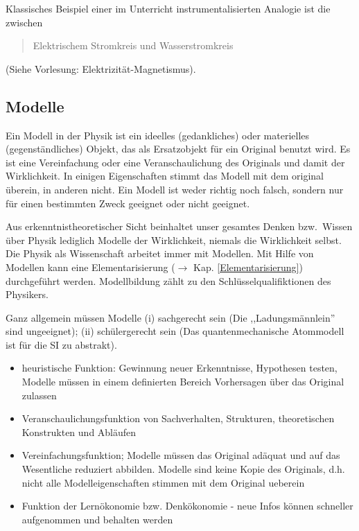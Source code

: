 Klassisches Beispiel einer im Unterricht instrumentalisierten
Analogie ist die zwischen
\begin{quote}
Elektrischem Stromkreis \q und \q Wasserstromkreis
\end{quote}
(Siehe Vorlesung: Elektrizit\"{a}t-Magnetismus).


\subsection{Modelle}

 Ein Modell in der Physik ist ein ideelles (gedankliches) oder materielles (gegenst\"{a}ndliches) Objekt, das als Ersatzobjekt f\"{u}r ein Original benutzt wird. Es ist eine Vereinfachung oder eine Veranschaulichung des Originals und damit der Wirklichkeit. In einigen Eigenschaften stimmt das Modell mit dem original \"{u}berein, in anderen nicht. Ein Modell ist weder richtig noch falsch, sondern nur f\"{u}r einen bestimmten Zweck geeignet oder nicht geeignet.

\mip
Aus erkenntnistheoretischer Sicht beinhaltet unser gesamtes Denken bzw.\ Wissen \"{u}ber Physik lediglich Modelle der Wirklichkeit, niemals die Wirklichkeit selbst. Die Physik als Wissenschaft arbeitet immer mit Modellen. Mit Hilfe von Modellen kann eine Elementarisierung ($\to$ Kap. \ref{Elementarisierung}) durchgef\"{u}hrt werden.  Modellbildung z\"{a}hlt zu den Schl\"{u}sselqualifiktionen des Physikers.

\mip
Ganz allgemein m\"{u}ssen Modelle (i) sachgerecht sein (Die ,,Ladungsm\"{a}nnlein'' sind ungeeignet); (ii) sch\"{u}lergerecht sein (Das quantenmechanische Atommodell ist f\"{u}r die SI zu abstrakt). 

\bip
{}

\begin{itemize}
\item heuristische Funktion: Gewinnung neuer Erkenntnisse, Hypothesen testen, Modelle m\"{u}ssen in einem definierten Bereich Vorhersagen \"{u}ber das Original zulassen
\item Veranschaulichungsfunktion von Sachverhalten, Strukturen, theoretischen Konstrukten und Abl\"{a}ufen
\item Vereinfachungsfunktion; Modelle m\"{u}ssen das Original ad\"{a}quat und auf das Wesentliche reduziert abbilden. Modelle sind keine Kopie des Originals, d.h. nicht alle Modelleigenschaften stimmen mit dem Original ueberein
\item Funktion der Lern\"{o}konomie bzw. Denk\"{o}konomie - neue Infos k\"{o}nnen schneller aufgenommen und behalten werden 
\end{itemize}


